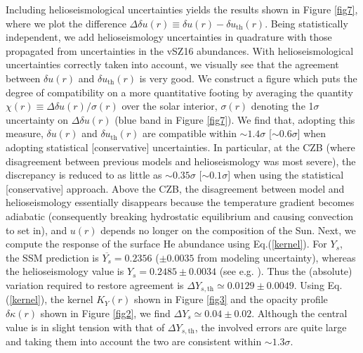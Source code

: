 \documentclass[aps,prl,twocolumn,showpacs]{revtex4}
\begin{document}
Including helioseismological uncertainties yields the results shown in Figure \ref{fig7}, where we plot the difference $\Delta \delta u(r) \equiv \delta u(r) - \delta u_{\text{th}}(r)$. Being statistically independent, we add helioseismology uncertainties in quadrature with those propagated from uncertainties in the vSZ16 abundances. With helioseismological uncertainties correctly taken into account, we visually see that the agreement between $\delta u(r)$ and $\delta u_{\text{th}}(r)$ is very good. We construct a figure which puts the degree of compatibility on a more quantitative footing by averaging the quantity $\chi (r) \equiv \Delta \delta u(r)/\sigma (r)$ over the solar interior, $\sigma(r)$ denoting the 1$\sigma$ uncertainty on $\Delta \delta u(r)$ (blue band in Figure \ref{fig7}). We find that, adopting this measure, $\delta u(r)$ and $\delta u_{\text{th}}(r)$ are compatible within $\sim 1.4 \sigma$ [$\sim 0.6 \sigma$] when adopting statistical [conservative] uncertainties. In particular, at the CZB (where disagreement between previous models and helioseismology was most severe), the discrepancy is reduced to as little as $\sim 0.35 \sigma$ [$\sim 0.1 \sigma$] when using the statistical [conservative] approach. Above the CZB, the disagreement between model and helioseismology essentially disappears because the temperature gradient becomes adiabatic (consequently breaking hydrostatic equilibrium and causing convection to set in), and $u(r)$ depends no longer on the composition of the Sun. \newline \indent
%
Next, we compute the response of the surface He abundance using Eq.(\ref{kernel}). For $Y_s$, the SSM prediction is $\overline{Y_s} = 0.2356$ ($\pm 0.0035$ from modeling uncertainty), whereas the helioseismology value is $Y_s = 0.2485 \pm 0.0034$ (see e.g. \cite{psq2long}). Thus the (absolute) variation required to restore agreement is $\Delta Y_{s,\text{th}} \simeq 0.0129 \pm 0.0049$. Using Eq.(\ref{kernel}), the kernel $K_Y(r)$ shown in Figure \ref{fig3} and the opacity profile $\delta \kappa (r)$ shown in Figure \ref{fig2}, we find $\Delta Y_s \simeq 0.04 \pm 0.02$. Although the central value is in slight tension with that of $\Delta Y_{s,\text{th}}$, the involved errors are quite large and taking them into account the two are consistent within $\sim 1.3\sigma$. \newline \indent
%
\end{document}
